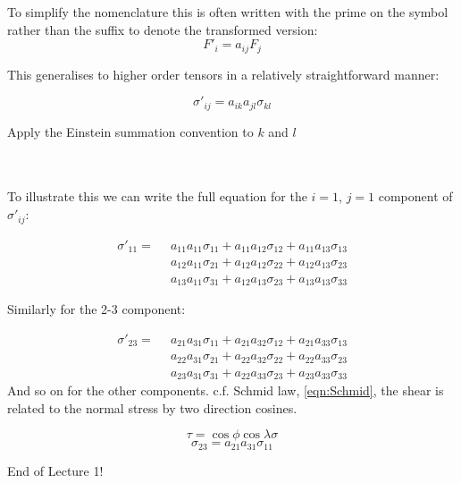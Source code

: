 To simplify the nomenclature this is often written with the prime on the symbol rather than the suffix to denote the transformed version:
\begin{equation}
F'_i = a_{ij}F_{j}
\end{equation}


This generalises to higher order tensors in a relatively straightforward manner:

\begin{equation}
\sigma'_{ij} = a_{ik} a_{jl} \sigma_{kl}
\end{equation}
\begin{annotation}
Apply the Einstein summation convention to $k$ and $l$
\end{annotation}
\\
\\

To illustrate this we can write the full equation for the $i=1$, $j=1$ component of $\sigma'_{ij}$:

\begin{align}
\sigma'_{11} =\,\,\, &a_{11}a_{11}\sigma_{11} + a_{11}a_{12}\sigma_{12} + a_{11}a_{13}\sigma_{13} \nonumber\\
 &a_{12}a_{11}\sigma_{21} + a_{12}a_{12}\sigma_{22} + a_{12}a_{13}\sigma_{23} \\
 &a_{13}a_{11}\sigma_{31} + a_{12}a_{13}\sigma_{23} + a_{13}a_{13}\sigma_{33} \nonumber
\end{align}



\begin{annotation}
Similarly for the 2-3 component:

\begin{align}
\sigma'_{23} =\,\,\, &a_{21}a_{31}\sigma_{11} + a_{21}a_{32}\sigma_{12} + a_{21}a_{33}\sigma_{13} \nonumber\\
                     &a_{22}a_{31}\sigma_{21} + a_{22}a_{32}\sigma_{22} + a_{22}a_{33}\sigma_{23} \nonumber \\
                     &a_{23}a_{31}\sigma_{31} + a_{22}a_{33}\sigma_{23} + a_{23}a_{33}\sigma_{33} \nonumber
\end{align}
And so on for the other components. c.f. Schmid law, \autoref{eqn:Schmid}, the shear is related to the normal stress by two direction cosines.

$$
\tau = \cos\phi \cos\lambda \sigma
$$
$$
\sigma_{23} = a_{21} a_{31} \sigma_{11}
$$

End of Lecture 1!
\end{annotation}
\\

